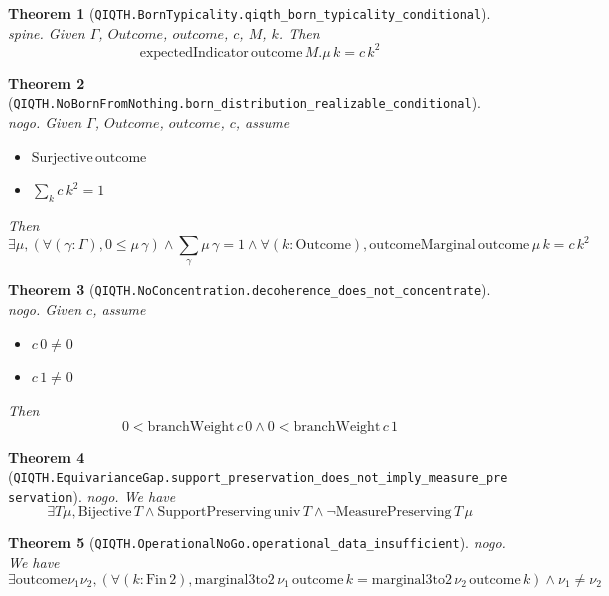 \documentclass[11pt]{article}
\newtheorem{theorem}{Theorem}[section]
\begin{document}
\begin{theorem}[\texttt{QIQTH.BornTypicality.qiqth\_born\_typicality\_conditional}]\label{thm:qiqth-borntypicality-qiqth-born-typicality-conditional}
\textit{spine.}
Given $Γ$, $Outcome$, $outcome$, $c$, $M$, $k$.
Then \[ \mathrm{expectedIndicator}\,\mathrm{outcome}\,M.\mu\,k = {c\,k}^{2} \]
\end{theorem}


\begin{theorem}[\texttt{QIQTH.NoBornFromNothing.born\_distribution\_realizable\_conditional}]\label{thm:qiqth-nobornfromnothing-born-distribution-realizable-conditional}
\textit{nogo.}
Given $Γ$, $Outcome$, $outcome$, $c$,
assume
\begin{itemize}
  \item[\rm(h\_surj)] $\mathrm{Surjective}\,\mathrm{outcome}$
  \item[\rm(hc\_norm)] $\sum_{k} {c\,k}^{2} = 1$
\end{itemize}
Then \[ \exists \mu, (\forall (\gamma : \Gamma), 0 \le \mu\,\gamma) \wedge \sum_{\gamma} \mu\,\gamma = 1 \wedge \forall (k : \mathrm{Outcome}), \mathrm{outcomeMarginal}\,\mathrm{outcome}\,\mu\,k = {c\,k}^{2} \]
\end{theorem}


\begin{theorem}[\texttt{QIQTH.NoConcentration.decoherence\_does\_not\_concentrate}]\label{thm:qiqth-noconcentration-decoherence-does-not-concentrate}
\textit{nogo.}
Given $c$,
assume
\begin{itemize}
  \item[\rm(h0)] $c\,0 \ne 0$
  \item[\rm(h1)] $c\,1 \ne 0$
\end{itemize}
Then \[ 0 < \mathrm{branchWeight}\,c\,0 \wedge 0 < \mathrm{branchWeight}\,c\,1 \]
\end{theorem}


\begin{theorem}[\texttt{QIQTH.EquivarianceGap.support\_preservation\_does\_not\_imply\_measure\_preservation}]\label{thm:qiqth-equivariancegap-support-preservation-does-not-imply-measure-preservation}
\textit{nogo.}
We have \[ \exists T \mu, \mathrm{Bijective}\,T \wedge \mathrm{SupportPreserving}\,\mathrm{univ}\,T \wedge \neg \mathrm{MeasurePreserving}\,T\,\mu \]
\end{theorem}


\begin{theorem}[\texttt{QIQTH.OperationalNoGo.operational\_data\_insufficient}]\label{thm:qiqth-operationalnogo-operational-data-insufficient}
\textit{nogo.}
We have \[ \exists \mathrm{outcome} \nu_{1} \nu_{2}, (\forall (k : \mathrm{Fin}\,2), \mathrm{marginal3to2}\,\nu_{1}\,\mathrm{outcome}\,k = \mathrm{marginal3to2}\,\nu_{2}\,\mathrm{outcome}\,k) \wedge \nu_{1} \ne \nu_{2} \]
\end{theorem}
\end{document}
